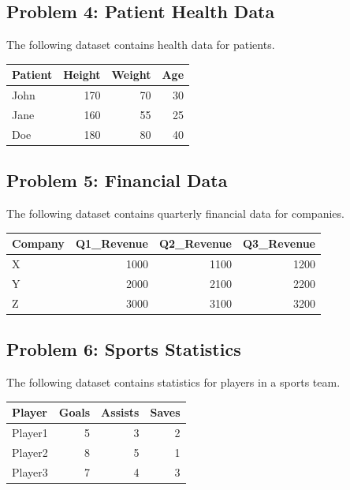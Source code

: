 \documentclass[
  letterpaper,
  DIV=11,
  numbers=noendperiod]{scrreprt}
\begin{document}
\subsection*{Problem 4: Patient Health
Data}\label{problem-4-patient-health-data}

The following dataset contains health data for patients.

\begin{table}
\centering
\begin{tabular}{l|r|r|r}
\hline
Patient & Height & Weight & Age\\
\hline
John & 170 & 70 & 30\\
\hline
Jane & 160 & 55 & 25\\
\hline
Doe & 180 & 80 & 40\\
\hline
\end{tabular}
\end{table}

\subsection*{Problem 5: Financial Data}\label{problem-5-financial-data}

The following dataset contains quarterly financial data for companies.

\begin{table}
\centering
\begin{tabular}{l|r|r|r}
\hline
Company & Q1\_Revenue & Q2\_Revenue & Q3\_Revenue\\
\hline
X & 1000 & 1100 & 1200\\
\hline
Y & 2000 & 2100 & 2200\\
\hline
Z & 3000 & 3100 & 3200\\
\hline
\end{tabular}
\end{table}

\subsection*{Problem 6: Sports
Statistics}\label{problem-6-sports-statistics}

The following dataset contains statistics for players in a sports team.

\begin{table}
\centering
\begin{tabular}{l|r|r|r}
\hline
Player & Goals & Assists & Saves\\
\hline
Player1 & 5 & 3 & 2\\
\hline
Player2 & 8 & 5 & 1\\
\hline
Player3 & 7 & 4 & 3\\
\hline
\end{tabular}
\end{table}
\end{document}
